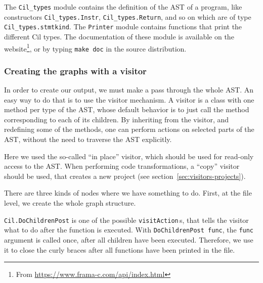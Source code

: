 The \texttt{Cil\_types} module contains the definition of the AST of a \C
program, like constructors \texttt{Cil\_types.Instr},
\texttt{Cil\_types.Return}, and so on which are of type
\texttt{Cil\_types.stmtkind}. The \texttt{Printer} module contains
functions that print the different Cil types. The documentation of these module
is available on the \framac website\footnote{From
\url{https://www.frama-c.com/api/index.html}}, or by typing
\texttt{make doc} in the \framac source distribution.

\subsubsection*{Creating the graphs with a visitor}

In order to create our output, we must make a pass through the whole
AST. An easy way to do that is to use the \framac visitor mechanism. A
visitor is a class with one method per type of the AST, whose default
behavior is to just call the method corresponding to each of its
children. By inheriting from the visitor, and redefining some of the
methods, one can perform actions on selected parts of the AST, without
the need to traverse the AST explicitly.


Here we used the so-called ``in place'' visitor, which should be used for
read-only access to the AST. When performing code transformations, a
``copy'' visitor should be used, that creates a new project (see
section~\ref{sec:visitors-projects}).

There are three kinds of nodes where we have something to do. First,
at the file level, we create the whole graph structure.


\texttt{Cil.DoChildrenPost} is one of the possible
\texttt{visitAction}\,s, that tells the visitor what to do after the
function is executed. With \texttt{DoChildrenPost func}, the \texttt{func}
argument is called once, after all children have been executed. Therefore,
we use it to close the curly braces after all functions have been printed
in the file.


